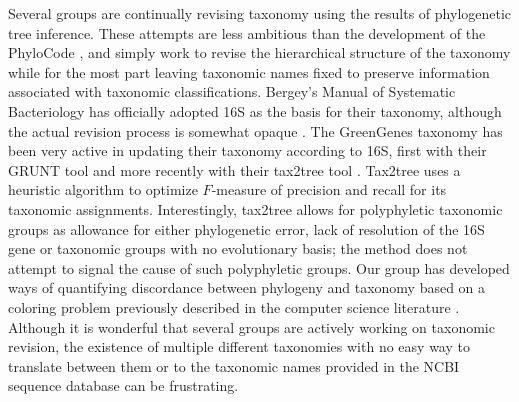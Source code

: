 \documentclass{amsart}
\begin{document}
Several groups are continually revising taxonomy using the results of phylogenetic tree inference.
These attempts are less ambitious than the development of the PhyloCode \citep{forey2001phylocode}, and simply work to revise the hierarchical structure of the taxonomy while for the most part leaving taxonomic names fixed to preserve information associated with taxonomic classifications.
Bergey's Manual of Systematic Bacteriology has officially adopted 16S as the basis for their taxonomy, although the actual revision process is somewhat opaque \citep{kreig1984bergey}.
The GreenGenes taxonomy \citep{desantis2006greengenes} has been very active in updating their taxonomy according to 16S, first with their GRUNT tool \citep{dalevi2007automated} and more recently with their tax2tree tool \citep{mcdonald2011improved}.
Tax2tree uses a heuristic algorithm to optimize $F$-measure of precision and recall for its taxonomic assignments.
Interestingly, tax2tree allows for polyphyletic taxonomic groups as allowance for either phylogenetic error, lack of resolution of the 16S gene or taxonomic groups with no evolutionary basis; the method does not attempt to signal the cause of such polyphyletic groups.
Our group \citep{matsen2012reconciling} has developed ways of quantifying discordance between phylogeny and taxonomy based on a coloring problem previously described in the computer science literature \citep{moran2008convex}.
Although it is wonderful that several groups are actively working on taxonomic revision, the existence of multiple different taxonomies with no easy way to translate between them or to the taxonomic names provided in the NCBI sequence database can be frustrating.
\end{document}
